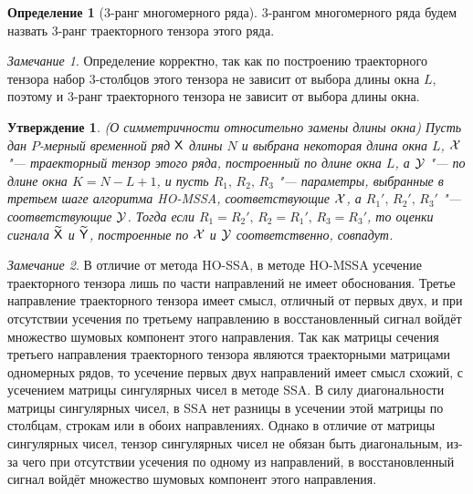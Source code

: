 \documentclass[specialist,
  substylefile=spbu_report.rtx,
subf,href,colorlinks=true, 12pt]{disser}
\theoremstyle{plain}
\newtheorem{statement}{Утверждение}[section]
\theoremstyle{definition}
\newtheorem{definition}{Определение}[section]
\theoremstyle{remark}
\newtheorem{remark}{Замечание}[section]
\begin{document}
\begin{definition}[3-ранг многомерного ряда]
  3-рангом многомерного ряда будем назвать 3-ранг траекторного
  тензора этого ряда.
\end{definition}
\begin{remark}
  Определение корректно, так как по построению траекторного тензора
  набор 3-столбцов этого тензора
  не зависит от выбора длины окна $L$, поэтому и $3$-ранг
  траекторного тензора не зависит от выбора
  длины окна.
\end{remark}

\begin{statement}
  \emph{(О симметричности относительно замены длины окна)}
  Пусть дан $P$-мерный временной ряд $\mathsf{X}$ длины $N$ и выбрана
  некоторая длина окна $L$,
  $\mathcal{X}$ "--- траекторный тензор этого ряда, построенный по длине окна $L$, а
  $\mathcal{Y}$ "--- по длине окна ${K = N - L + 1}$, и пусть
  $R_1,\, R_2,\, R_3$ "--- параметры, выбранные в третьем шаге
  алгоритма \emph{HO-MSSA}, соответствующие $\mathcal{X}$,
  а $R_1',\, R_2',\, R_3'$ "--- соответствующие $\mathcal{Y}$.
  Тогда если $R_1 = R_2',\, R_2 = R_1',\,  R_3 = R_3'$, то
  оценки сигнала $\widetilde{\mathsf{X}}$ и $\widetilde{\mathsf{Y}}$, построенные
  по $\mathcal{X}$ и $\mathcal{Y}$ соответственно,
  совпадут.
\end{statement}

\begin{remark}\label{remark:ho-mssa-trunc-dims}
  В отличие от метода HO-SSA, в методе HO-MSSA усечение траекторного тензора
  лишь по части направлений не имеет обоснования.
  Третье направление траекторного тензора имеет смысл,
  отличный от первых двух, и при отсутствии усечения по третьему
  направлению в восстановленный сигнал войдёт множество шумовых компонент
  этого направления.
  Так как матрицы сечения третьего направления траекторного тензора
  являются траекторными матрицами одномерных рядов, то усечение
  первых двух направлений имеет смысл схожий, с усечением матрицы
  сингулярных чисел в методе SSA.
  В силу диагональности матрицы сингулярных чисел, в
  SSA нет разницы в усечении этой матрицы по столбцам, строкам или в
  обоих направлениях.
  Однако в отличие от матрицы сингулярных чисел, тензор сингулярных чисел
  не обязан быть диагональным, из-за чего при отсутствии усечения по одному
  из направлений, в восстановленный сигнал войдёт множество шумовых
  компонент этого направления.
\end{remark}
\end{document}

